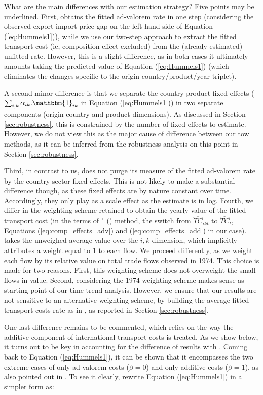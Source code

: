 \documentclass[a4paper,11pt]{article}
\newcommand\citeh[1]{\citeauthor{#1}'\ (\citeyear{#1})}
\begin{document}
What are the main differences with our estimation strategy? Five points may be underlined. First, \cite{hummels2007} obtains the fitted ad-valorem rate in one step (considering the observed export-import price gap on the left-hand side of Equation (\ref{eq:Hummels1})), while we use our two-step approach to extract the fitted transport cost (ie, composition effect excluded) from the (already estimated) unfitted rate. However, this is a slight difference, as in both cases it ultimately amounts taking the predicted value of Equation (\ref{eq:Hummels1}) (which eliminates the changes specific to the origin country/product/year triplet).

A second minor difference is that we separate the country-product fixed effects ($\sum_{i,k}\alpha_{ik}.\mathbbm{1}_{ik}$ in Equation (\ref{eq:Hummels1})) in two separate components (origin country and product dimensions). As discussed in Section \ref{sec:robustness}, this is constrained by the number of fixed effects to estimate. However, we do not view this as the major cause of difference between our tow methods, as it can be inferred from the robustness analysis on this point in Section \ref{sec:robustness}.

Third, in contrast to us, \cite{hummels2007} does not purge its measure of the fitted ad-valorem rate by the country-sector fixed effects. This is not likely to make a substantial difference though, as these fixed effects are by nature constant over time. Accordingly, they only play as a scale effect as the estimate is in log. Fourth, we differ in the weighting scheme retained to obtain the yearly value of the fitted transport cost (in the terms of \citeh{hummels2007} method, the switch from $\widehat{TC}_{ikt}$ to $\widehat{TC}_{t}$, Equations (\ref{eq:comp_effects_adv}) and (\ref{eq:comp_effects_add}) in our case). \cite{hummels2007} takes the unweighed average value over the $i,k$ dimension, which implicitly attributes a weight equal to 1 to each flow. We proceed differently, as we weight each flow by its relative value on total trade flows observed in 1974. This choice is made for two reasons. First, this weighting scheme does not overweight the small flows in value. Second, considering the 1974 weighting scheme makes sense as starting point of our time trend analysis. However, we ensure that our results are not sensitive to an alternative weighting scheme, by building the average fitted transport costs rate as in \cite{hummels2007}, as reported in Section \ref{sec:robustness}.

One last difference remains to be commented, which relies on the way the additive component of international transport costs is treated. As we show below, it turns out to be key in accounting for the difference of results with \cite{hummels2007}. Coming back to Equation (\ref{eq:Hummels1}), it can be shown that it encompasses the two extreme cases of only ad-valorem costs ($\beta = 0$) and only additive costs ($\beta=1$), as also pointed out in \cite{hummels_skiba}. To see it clearly, rewrite Equation (\ref{eq:Hummels1}) in a simpler form as:
\end{document}

